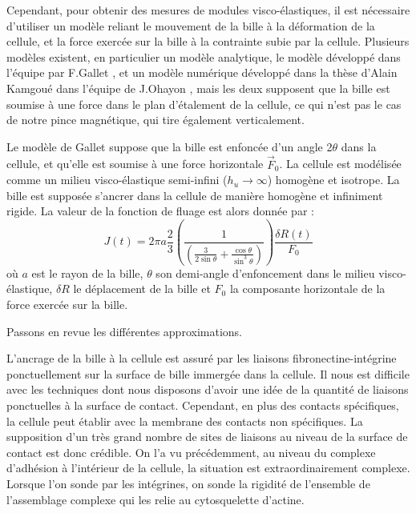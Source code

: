 	Cependant, pour obtenir des mesures de modules visco-élastiques, il est nécessaire d'utiliser un modèle reliant le mouvement de la bille à la déformation de la cellule, et la force exercée sur la bille à la contrainte subie par la cellule.
	Plusieurs modèles existent, en particulier un modèle analytique, le modèle développé dans l'équipe par F.Gallet \parencite{laurent_assessment_2002}, et un modèle numérique développé dans la thèse d'Alain Kamgoué dans l'équipe de J.Ohayon \parencite{kamgoue_estimation_2007}, mais les deux supposent que la bille est soumise à une force dans le plan d'étalement de la cellule, ce qui n'est pas le cas de notre pince magnétique, qui tire également verticalement. 
	
	Le modèle de Gallet suppose que la bille est enfoncée d'un angle 2$\theta$ dans la cellule, et qu'elle est soumise à une force horizontale $\vec{F}_0$. La cellule est modélisée comme un milieu visco-élastique semi-infini ($h_u \rightarrow \infty$) homogène et isotrope. La bille est supposée s'ancrer dans la cellule de manière homogène et infiniment rigide. 
	La valeur de la fonction de fluage est alors donnée par : 
	\begin{equation}
	J(t)=2\pi a \frac{2}{3}\left(\frac{1}{\left( \frac{3}{2 \sin \theta}+\frac{\cos \theta}{\sin^3 \theta}\right)} \right)  \frac{\delta R(t)}{F_0} 
	\label{Fluage}
	\end{equation}
	où $a$ est le rayon de la bille, $\theta$ son demi-angle d'enfoncement dans le milieu visco-élastique, $\delta R$ le déplacement de la bille et $F_0$ la composante horizontale de la force exercée sur la bille. 
	
	Passons en revue les différentes approximations.
	
	 L'ancrage de la bille à la cellule est assuré par les liaisons fibronectine-intégrine ponctuellement sur la surface de bille immergée dans la cellule. Il nous est difficile avec les techniques dont nous disposons d'avoir une idée de la quantité de liaisons ponctuelles à la surface de contact. Cependant, en plus des contacts spécifiques, la cellule peut établir avec la membrane des contacts non spécifiques. La supposition d'un très grand nombre de sites de liaisons au niveau de la surface de contact est donc crédible. On l'a vu précédemment, au niveau du complexe d'adhésion à l'intérieur de la cellule, la situation est extraordinairement complexe. Lorsque l'on sonde par les intégrines, on sonde la rigidité de l'ensemble de l'assemblage complexe qui les relie au cytosquelette d'actine. 
	
